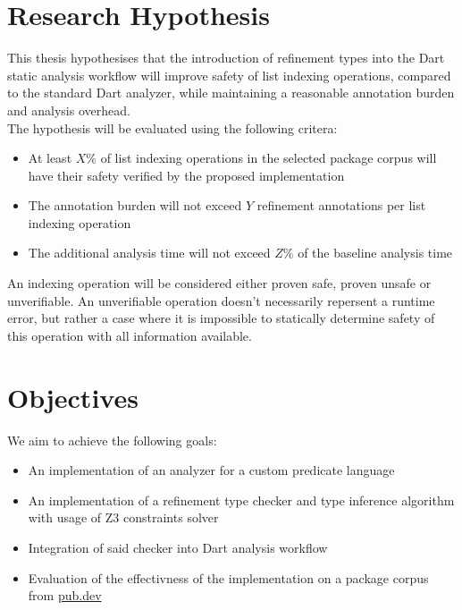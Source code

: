 \section{Research Hypothesis}
\label{sec:research_hypothesis}
This thesis hypothesises that the introduction of refinement types into the
Dart static analysis workflow will improve safety of list indexing operations, compared
to the standard Dart analyzer, while maintaining a reasonable annotation burden and 
analysis overhead.\\The hypothesis will be evaluated using the following critera:

\begin{itemize}
    \item At least $X\%$ of list indexing operations in the selected package corpus will have their safety
    verified by the proposed implementation
    \item The annotation burden will not exceed $Y$ refinement annotations per list indexing operation
    \item The additional analysis time will not exceed $Z\%$ of the baseline analysis time
\end{itemize}
An indexing operation will be considered either proven safe, proven unsafe or unverifiable.
An unverifiable operation doesn't necessarily repersent a runtime error, but rather a case
where it is impossible to statically determine safety of this operation with all information available.

\section{Objectives}
\label{sec:objectives}
We aim to achieve the following goals:
\begin{itemize}
    \item An implementation of an analyzer for a custom predicate language 
    \item An implementation of a refinement type checker and type inference algorithm with usage of Z3 constraints solver
    \item Integration of said checker into Dart analysis workflow \cite{AnalyzerPlugins}
    \item Evaluation of the effectivness of the implementation on a package corpus from \href{pub.dev}{pub.dev}
\end{itemize}

